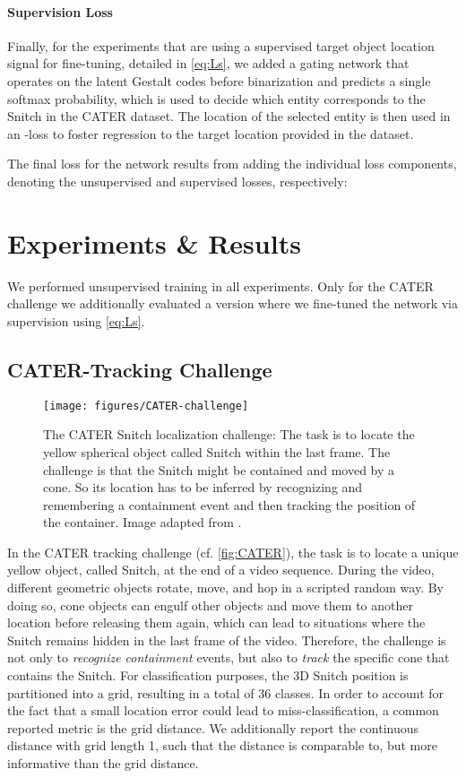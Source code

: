 \documentclass{article} \usepackage{iclr2023_conference_arxiv,times}
\begin{document}
\paragraph{Supervision Loss}
Finally, for the experiments that are using a supervised target object location signal for fine-tuning, detailed in \autoref{eq:Ls}, we added a gating network  that operates on the latent Gestalt codes  before binarization and predicts a single softmax probability, which is used to decide which entity corresponds to the Snitch in the CATER dataset. The location of the selected entity is then used in an -loss to foster regression to the target location provided in the dataset.


The final loss for the network results from adding the individual loss components, denoting the unsupervised and supervised losses, respectively:



\section{Experiments \& Results}
We performed unsupervised training in all experiments. 
Only for the CATER challenge we additionally evaluated a version where we fine-tuned the network via supervision using \autoref{eq:Ls}. 


\subsection{CATER-Tracking Challenge}

\begin{figure}[b!]
  \texttt{[image: figures/CATER-challenge]}
  \vspace{-.5cm}
  \caption{The CATER Snitch localization challenge: The task is to locate the yellow spherical object called Snitch within the last frame. The challenge is that the Snitch might be contained and moved by a cone. So its location has to be inferred by recognizing and remembering a containment event and then tracking the position of the container. Image adapted from \cite{girdhar2019CATER}.}
\label{fig:CATER}
\end{figure}

In the CATER tracking challenge (cf. \autoref{fig:CATER}), the task is to locate a unique yellow object, called Snitch, at the end of a video sequence. During the video, different geometric objects rotate, move, and hop in a scripted random way. By doing so, cone objects can engulf other objects and move them to another location before releasing them again, which can lead to situations where the Snitch remains hidden in the last frame of the video. Therefore, the challenge is not only to \emph{recognize containment} events, but also to \emph{track} the specific cone that contains the Snitch. For classification purposes, the 3D Snitch position is partitioned into a  grid, resulting in a total of 36 classes. In order to account for the fact that a small location error could lead to miss-classification, a common reported metric is the  grid distance.
We additionally report the continuous  distance with grid length 1, such that the distance is comparable to, but more informative than the  grid distance.
\end{document}
